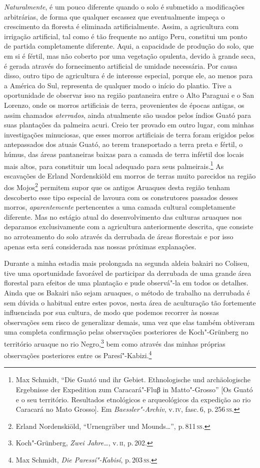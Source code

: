 \textit{Naturalmente}, é um pouco diferente quando o solo é submetido a
modificações arbitrárias, de forma que qualquer escassez que
eventualmente impeça o crescimento da floresta é eliminada
artificialmente. Assim, a agricultura com irrigação artificial, tal como
é tão frequente no antigo Peru, constitui um ponto de partida
completamente diferente. Aqui, a capacidade de produção do solo, que em
si é fértil, mas não coberto por uma vegetação opulenta, devido à grande
seca, é gerada através do fornecimento artificial de umidade necessária.
Por causa disso, outro tipo de agricultura é de interesse especial,
porque ele, ao menos para a América do Sul, representa de qualquer modo
o início do plantio. Tive a oportunidade de observar isso na região
pantaneira entre o Alto Paraguai e o San Lorenzo, onde os morros
artificiais de terra, provenientes de épocas antigas, os assim chamados
\textit{aterrados}, ainda atualmente são usados pelos índios Guató para suas
plantações da palmeira acuri. Creio ter provado em outro lugar, com
minhas investigações minuciosas, que esses morros artificiais de terra
foram erigidos pelos antepassados dos atuais Guató, ao terem
transportado a terra preta e fértil, o húmus, das áreas pantaneiras
baixas para a camada de terra infértil dos locais mais altos, para
constituir um local adequado para seus palmeirais.\footnote{Max Schmidt,
  ``Die Guató und ihr Gebiet. Ethnologische und archäologische
  Ergebnisse der Expedition zum Caracará"-Fluβ in Matto"-Grosso'' {[}Os
  Guató e o seu território. Resultados etnológicos e arqueológicos da
  expedição ao rio Caracará no Mato Grosso{]}. Em
  \textit{Baessler"-Archiv}, v.\,\textsc{iv}, fasc.\,6, p.\,256\,\textsc{ss}.} As escavações
de Erland Nordenskiöld em morros de terras muito parecidos na região dos
Mojos\footnote{Erland Nordenskiöld, ``Urnengräber und Mounds\ldots'', p.\,811\,\textsc{ss}.} permitem supor que os
antigos Aruaques desta região tenham descoberto esse tipo especial de lavoura
com os construtores passados desses morros, \textit{aparentemente} pertencentes
a uma camada cultural completamente diferente. Mas no estágio atual do
desenvolvimento das culturas aruaques nos deparamos exclusivamente com a
agricultura anteriormente descrita, que consiste no arroteamento do solo
através da derrubada de áreas florestais e por isso apenas esta será
considerada nas nossas próximas explanações.

Durante a minha estadia mais prolongada na segunda aldeia bakairi no
Coliseu, tive uma oportunidade favorável de participar da derrubada de
uma grande área florestal para efeitos de uma plantação e pude
observá"-la em todos os detalhes. Ainda que os Bakairi não sejam aruaques,
o método de trabalho na derrubada é sem dúvida o habitual entre estes povos, 
nesta área de aculturação tão fortemente influenciada por sua cultura, 
de modo que podemos recorrer às nossas observações sem
risco de generalizar demais, uma vez que elas também obtiveram uma
completa confirmação pelas observações posteriores de Koch"-Grünberg no
território aruaque no rio Negro,\footnote{Koch"-Grünberg, \textit{Zwei Jahre\ldots}, v.\,\textsc{ii}, p.\,202.} bem como através das
minhas próprias observações posteriores entre os Paresí"-Kabizi.\footnote{Max
  Schmidt, \textit{Die Paressí"-Kabisí}, p.\,203\,\textsc{ss}.}

